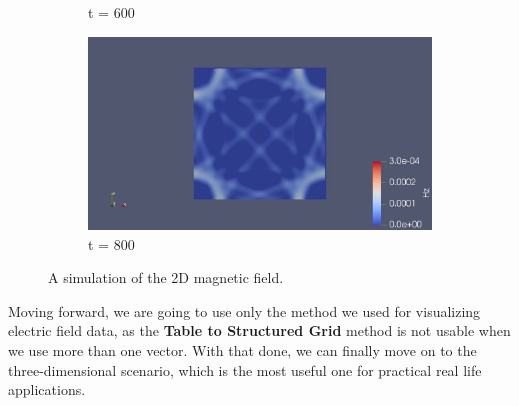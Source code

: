 \begin{figure}[h!]
\begin{subfigure}{.49\textwidth}
		\caption{t = 600}
	\end{subfigure}
	\begin{subfigure}{.49\textwidth}
		\centering
		\includegraphics[width=.95\linewidth]{Figures/FDTD2DH4}
		\caption{t = 800}
	\end{subfigure}
	\decoRule
	\caption[2D Magnetic Field Simulation]{A simulation of the 2D magnetic field.}
	\label{fig:FDTD2DH}
\end{figure}

Moving forward, we are going to use only the method we used for visualizing electric field data, as the \textbf{Table to Structured Grid} method is not usable when we use more than one vector. With that done, we can finally move on to the three-dimensional scenario, which is the most useful one for practical real life applications.